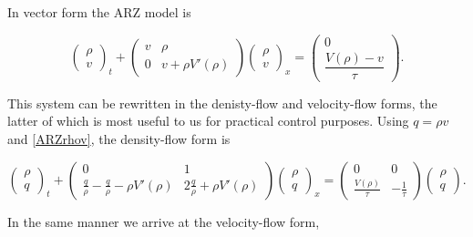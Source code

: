 \documentclass[review]{elsarticle}
\begin{document}
In vector form the ARZ model is

\begin{equation} \label{ARZrhov}
\begin{pmatrix}
\rho \\ v
\end{pmatrix}_t
+ \begin{pmatrix}
v & \rho \\
0 & v + \rho V' (\rho)
\end{pmatrix}
\begin{pmatrix}
\rho \\ v
\end{pmatrix}_x = 
\begin{pmatrix}
0 \\ \dfrac{V(\rho) - v}{\tau}
\end{pmatrix}.
\end{equation}

This system can be rewritten in the denisty-flow and velocity-flow forms, the latter of which is most useful to us for practical control purposes. Using $q = \rho v$ and \eqref{ARZrhov}, the density-flow form is

\begin{equation} \label{ARZrhoq}
\begin{pmatrix}
\rho \\ q
\end{pmatrix}_t
+ \begin{pmatrix}
0 & 1 \\
\frac{q}{\rho}  -\frac{q}{\rho} - \rho V'(\rho) & 2\frac{q}{\rho} + \rho V'(\rho)
\end{pmatrix}
\begin{pmatrix}
\rho \\ q
\end{pmatrix}_x = 
\begin{pmatrix}
0 & 0 \\ 
\frac{V(\rho)}{\tau} & -\frac{1}{\tau}
\end{pmatrix} 
\begin{pmatrix}
\rho \\ q
\end{pmatrix}.
\end{equation}

In the same manner we arrive at the velocity-flow form,
\end{document}
